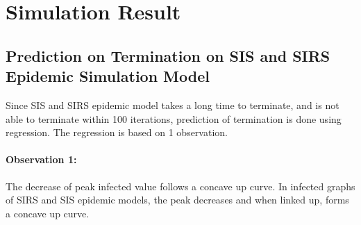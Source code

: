 \documentclass{subfile}
\begin{document}
  \section{Simulation Result}
  \subsection{Prediction on Termination on SIS and SIRS Epidemic Simulation Model}
  Since SIS and SIRS epidemic model takes a long time to terminate, and is not able to terminate within 100 iterations, prediction of termination is done using regression. The regression is based on 1 observation.

  \paragraph{Observation 1: }The decrease of peak infected value follows a concave up curve. In infected graphs of SIRS and SIS epidemic models, the peak decreases and when linked up, forms a concave up curve.
\end{document}

